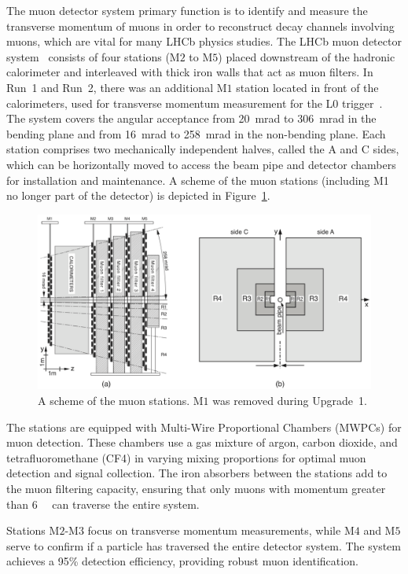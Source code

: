 The muon detector system primary function is to identify and measure the transverse momentum of muons in order to reconstruct decay channels involving muons, which are vital for many LHCb physics studies.
The LHCb muon detector system~\cite{Alves_2013} consists of four stations (M$2$ to M$5$) placed downstream of the hadronic calorimeter and interleaved with thick iron walls that act as muon filters. In Run~1 and Run~2, there was an additional M$1$ station located in front of the calorimeters, used for transverse momentum measurement for the L$0$ trigger~\cite{muon_upgrade}. The system covers the angular acceptance from \SI{20}{\milli\radian} to \SI{306}{\milli\radian} in the bending plane and from \SI{16}{\milli\radian} to \SI{258}{\milli\radian} in the non-bending plane. Each station comprises two mechanically independent halves, called the A and C sides, which can be horizontally moved to access the beam pipe and detector chambers for installation and maintenance.
A scheme of the muon stations (including M1 no longer part of the detector) is depicted in Figure~\ref{fig:muon}.
\begin{figure}
    \centering
    \includegraphics[width=\textwidth]{figures/muon.png}
    \caption{A scheme of the muon stations. M$1$ was removed during Upgrade~1.}
    \label{fig:muon}
\end{figure}
The stations are equipped with Multi-Wire Proportional Chambers (MWPCs) for muon detection. These chambers use a gas mixture of argon, carbon dioxide, and tetrafluoromethane (CF4) in varying mixing proportions for optimal muon detection and signal collection. The iron absorbers between the stations add to the muon filtering capacity, ensuring that only muons with momentum greater than \SI[per-mode=symbol]{6}{\giga\eVperc} can traverse the entire system.

Stations M$2$-M$3$ focus on transverse momentum measurements, while M$4$ and M$5$ serve to confirm if a particle has traversed the entire detector system. The system achieves a 95\% detection efficiency, providing robust muon identification. 

